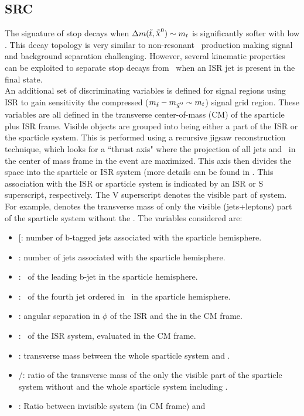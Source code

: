  

\subsection{SRC}
The signature of stop decays when $\Delta m(\stop,\LSP)\sim m_{t}$ is significantly softer with low \met. This decay topology is very similar to non-resonant \ttbar\ production making signal and background separation challenging. However, several kinematic properties can be exploited to separate stop decays from \ttbar\ when an ISR jet is present in the final state. \\

An additional set of discriminating variables is defined for signal regions using ISR to gain sensitivity the compressed ($\mstop-\mLSP\sim m_t$) signal grid region. These variables are all defined in the transverse center-of-mass (CM) of the sparticle plus ISR frame. Visible objects are grouped into being either a part of the ISR or the sparticle system. This is performed using a recursive jigsaw reconstruction technique, which looks for a ``thrust axis" where the \pt\-projection of all jets and \met\ in the center of mass frame in the event are maximized.  This axis then divides the space into the sparticle or ISR system (more details can be found in \cite{RJR_ISR}.  This association with the ISR or sparticle system is indicated by an ISR or S superscript, respectively. The V superscript denotes the visible part of system.  For example, \mV denotes the transverse mass of only the visible (jets+leptons) part of the sparticle system without the \met.  The variables considered are:

\begin{itemize}
\item [\boldmath \nBJetS: number of b-tagged jets associated with the sparticle hemisphere.
\item \nJetS: number of jets associated with the sparticle hemisphere.
\item  \pTSBZero: \pt\ of the leading b-jet in the sparticle hemisphere.
\item  \pTSFour: \pt\ of the fourth jet ordered in \pt\ in the sparticle hemisphere.
\item  \dPhiISRMET: angular separation in $\phi$ of the ISR and the \met in the CM frame.
\item  \pTISR: \pt\ of the ISR system, evaluated in the CM frame.
\item  \mS: transverse mass between the whole sparticle system and \met.
\item  \mV/\mS: ratio of the transverse mass of the only the visible part of the sparticle system without \met and the whole sparticle system including \met.
\item  \rISR: Ratio between invisible system (\met in CM frame) and \pTISR
\end{itemize}


